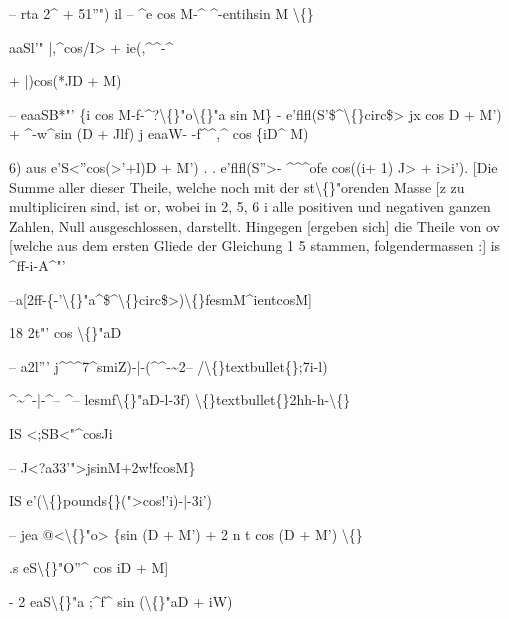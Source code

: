 \documentclass[10pt,a4paper]{article}
\begin{document}
-- rta 2\textasciicircum{} + 51''") il -- \textasciicircum{}e cos M-\textasciicircum{} \textasciicircum{}-entihsin M \textbackslash\{\}

aaSl'" |,\textasciicircum{}cos/I> + ie(,\textasciicircum{}\textasciicircum{}-\textasciicircum{}

+ |)cos(*JD + M)

-- eaaSB*"' \{i cos M-f-\textasciicircum{}?\textbackslash\{\}"o\textbackslash\{\}"a sin M\}
- e'flfl(S'\$\textasciicircum{}\textbackslash\{\}circ\$> jx cos D + M') + \textasciicircum{}-w\textasciicircum{}sin (D + Jlf) j
eaaW- -f\textasciicircum{}\textasciicircum{},\textasciicircum{} cos \{iD\textasciicircum{} M)

6) aus e'S<''cos(>'+l)D + M') . . e'flfl(S''>- \textasciicircum{}\textasciicircum{}\textasciicircum{}ofe cos((i+ 1) J> + i>i').
[Die Summe aller dieser Theile, welche noch mit der st\textbackslash\{\}"orenden Masse [z
zu multipliciren sind, ist or, wobei in 2, 5, 6 i alle positiven und negativen
ganzen Zahlen, Null ausgeschlossen, darstellt.
Hingegen [ergeben sich] die Theile von ov [welche aus dem ersten Gliede
der Gleichung 1 5 stammen, folgendermassen :]
is \textasciicircum{}ff-i-A\textasciicircum{}"'

--a[2ff-\{-'\textbackslash\{\}"a\textasciicircum{}\$\textasciicircum{}\textbackslash\{\}circ\$>)\textbackslash\{\}fesmM\textasciicircum{}ientcosM]

18 2t"' cos \textbackslash\{\}"aD

-- a2l''' j\textasciicircum{}\textasciicircum{}\textasciicircum{}7\textasciicircum{}smiZ)-|-(\textasciicircum{}\textasciicircum{}-\textasciitilde{}2--
/\textbackslash\{\}textbullet\{\};7i-l)

\textasciicircum{}\textasciitilde{}\textasciicircum{}-|-\textasciicircum{}-- \textasciicircum{}-- lesmf\textbackslash\{\}"aD-l-3f)
\textbackslash\{\}textbullet\{\}2hh-h-\textbackslash\{\}

IS <;SB<"\textasciicircum{}cosJi

-- J<?a33'">jsinM+2w!fcosM\}

IS e'(\textbackslash\{\}pounds\{\}(">cos!'i)-|-3i')

-- jea @<\textbackslash\{\}"o> \{sin (D + M') + 2 n t cos (D + M') \textbackslash\{\}

.s eS\textbackslash\{\}"O''\textasciicircum{} cos iD + M]

- 2 eaS\textbackslash\{\}"a ;\textasciicircum{}f\textasciicircum{} sin (\textbackslash\{\}"aD + iW)
\end{document}
